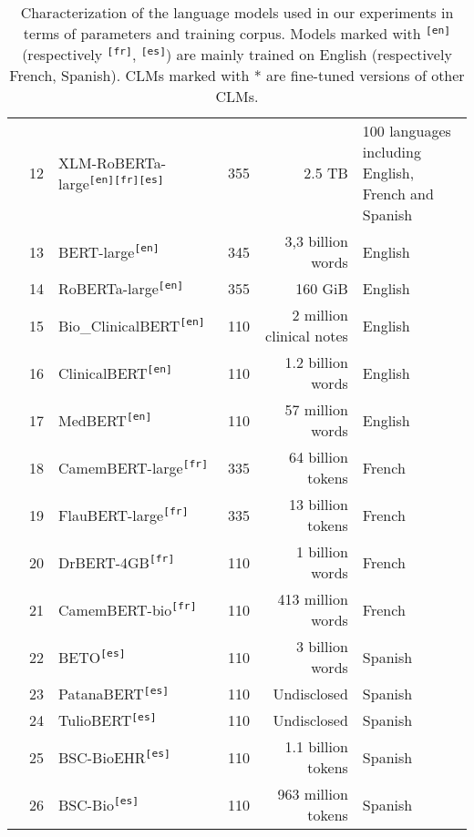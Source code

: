 \begin{table}[ht]
{\begin{tabular}{cllrrl}
 & 12 & XLM-RoBERTa-large\textsuperscript{\texttt{[en]}}\textsuperscript{\texttt{[fr]}}\textsuperscript{\texttt{[es]}} \cite{conneau2020unsupervised} & 355 & 2.5 TB & 100 languages including English, French and Spanish \\
 & 13 & BERT-large\textsuperscript{\texttt{[en]}} \cite{devlin2019bert} & 345 & 3,3 billion words & English \\
 & 14 & RoBERTa-large\textsuperscript{\texttt{[en]}} \cite{liu2019roberta} & 355 & 160 GiB & English \\
 & 15 & Bio\_ClinicalBERT\textsuperscript{\texttt{[en]}} \cite{alsentzer2019publicly} & 110 & 2 million clinical notes & English \\
 & 16 & ClinicalBERT\textsuperscript{\texttt{[en]}} \cite{wang2023optimized} & 110 & 1.2 billion words & English \\
 & 17 & MedBERT\textsuperscript{\texttt{[en]}} \cite{charangan2022medbert} & 110 & 57 million words & English \\
 & 18 & CamemBERT-large\textsuperscript{\texttt{[fr]}} \cite{martin2019camembert} & 335 & 64 billion tokens & French \\
 & 19 & FlauBERT-large\textsuperscript{\texttt{[fr]}} \cite{le2019flaubert} & 335 & 13 billion tokens & French \\
 & 20 & DrBERT-4GB\textsuperscript{\texttt{[fr]}} \cite{labrak2023drbert} & 110 & 1 billion words & French \\
 & 21 & CamemBERT-bio\textsuperscript{\texttt{[fr]}} \cite{touchent2023camembertbio} & 110 & 413 million words & French \\
 & 22 & BETO\textsuperscript{\texttt{[es]}} \cite{canete2020beto} & 110 & 3 billion words & Spanish \\
 & 23 & PatanaBERT\textsuperscript{\texttt{[es]}} & 110 & Undisclosed & Spanish \\
 & 24 & TulioBERT\textsuperscript{\texttt{[es]}} & 110 & Undisclosed & Spanish \\
 & 25 & BSC-BioEHR\textsuperscript{\texttt{[es]}} \cite{carrino2022pretrained} & 110 & 1.1 billion tokens & Spanish \\
 & 26 & BSC-Bio\textsuperscript{\texttt{[es]}} \cite{carrino2022pretrained} & 110 & 963 million tokens & Spanish \\
\bottomrule
\end{tabular}}
\caption{Characterization of the language models used in our experiments in terms of parameters and training corpus. Models marked with \textsuperscript{\texttt{[en]}} (respectively \textsuperscript{\texttt{[fr]}}, \textsuperscript{\texttt{[es]}}) are mainly trained on English (respectively French, Spanish). CLMs marked with * are fine-tuned versions of other CLMs.}
\label{tab:LM_features}
\end{table}
